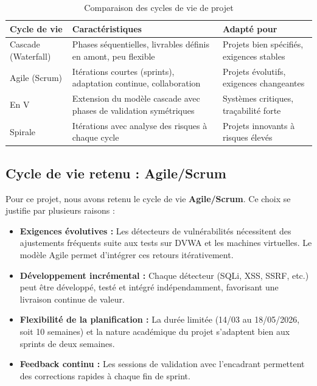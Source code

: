 \documentclass[12pt,a4paper]{report}
\newcommand{\hdr}[1]{\cellcolor{gray!15}\textbf{#1}}
\newcommand{\rowA}{\rowcolor{gray!8}}
\begin{document}
\begin{table}[H]
\centering
\caption{Comparaison des cycles de vie de projet}
\begin{tabular}{p{3.5cm}p{5cm}p{4cm}}
\toprule
\hdr{Cycle de vie} & \hdr{Caractéristiques} & \hdr{Adapté pour} \\
\midrule
Cascade (Waterfall) & Phases séquentielles, livrables définis en amont, peu flexible &
  Projets bien spécifiés, exigences stables \\
\rowA Agile (Scrum) & Itérations courtes (sprints), adaptation continue, collaboration &
  Projets évolutifs, exigences changeantes \\
En V & Extension du modèle cascade avec phases de validation symétriques &
  Systèmes critiques, traçabilité forte \\
\rowA Spirale & Itérations avec analyse des risques à chaque cycle &
  Projets innovants à risques élevés \\
\bottomrule
\end{tabular}
\end{table}

\subsection{Cycle de vie retenu : Agile/Scrum}

Pour ce projet, nous avons retenu le cycle de vie \textbf{Agile/Scrum}. Ce choix
se justifie par plusieurs raisons :

\begin{itemize}
  \item \textbf{Exigences évolutives :} Les détecteurs de vulnérabilités nécessitent
    des ajustements fréquents suite aux tests sur DVWA et les machines virtuelles.
    Le modèle Agile permet d'intégrer ces retours itérativement.

  \item \textbf{Développement incrémental :} Chaque détecteur (SQLi, XSS, SSRF, etc.)
    peut être développé, testé et intégré indépendamment, favorisant une livraison
    continue de valeur.

  \item \textbf{Flexibilité de la planification :} La durée limitée (14/03 au 18/05/2026,
    soit 10 semaines) et la nature académique du projet s'adaptent bien aux sprints
    de deux semaines.

  \item \textbf{Feedback continu :} Les sessions de validation avec l'encadrant permettent
    des corrections rapides à chaque fin de sprint.
\end{itemize}
\end{document}
